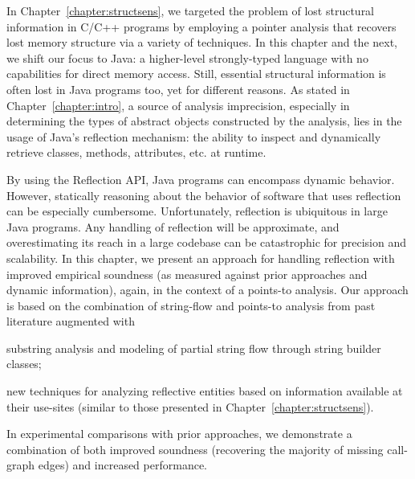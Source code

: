 \label{chapter:reflection}

In Chapter~\ref{chapter:structsens}, we targeted the problem of lost
structural information in C/C++ programs by employing a pointer
analysis that recovers lost memory structure via a variety of
techniques. In this chapter and the next, we shift our focus to Java:
a higher-level strongly-typed language with no capabilities for direct
memory access.
%
Still, essential structural information is often lost in Java programs
too, yet for different reasons. As stated in
Chapter~\ref{chapter:intro}, a source of analysis imprecision,
especially in determining the types of abstract objects constructed by
the analysis, lies in the usage of Java's reflection mechanism: the
ability to inspect and dynamically retrieve classes, methods, attributes,
etc. at runtime.

By using the Reflection API, Java programs can encompass dynamic
behavior. However, statically reasoning about the behavior of software
that uses reflection can be especially cumbersome.
%
Unfortunately, reflection is ubiquitous in large Java programs.
%
Any handling of reflection will be approximate, and overestimating its
reach in a large codebase can be catastrophic for precision and
scalability. In this chapter, we present an approach for handling
reflection with improved empirical soundness (as measured against
prior approaches and dynamic information), again, in the context of a
points-to analysis. Our approach is based on the combination of
string-flow and points-to analysis from past literature augmented with
\begin{inparaenum}[(a)]
\item substring analysis and modeling of partial string flow through
  string builder classes;
\item new techniques for analyzing reflective entities based on
  information available at their use-sites (similar to those presented
  in Chapter~\ref{chapter:structsens}).
\end{inparaenum}
In experimental comparisons with prior approaches, we demonstrate a
combination of both improved soundness (recovering the majority of
missing call-graph edges) and increased performance.


